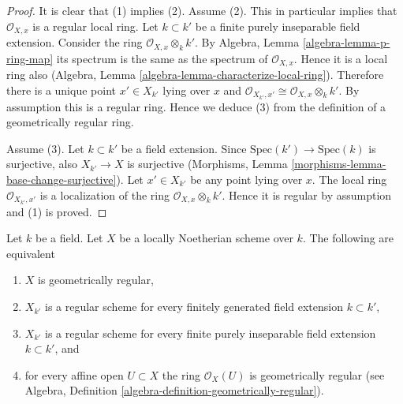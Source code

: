 \begin{proof}
It is clear that (1) implies (2).
Assume (2). This in particular implies that $\mathcal{O}_{X, x}$
is a regular local ring. Let $k \subset k'$ be a finite purely inseparable
field extension. Consider the ring $\mathcal{O}_{X, x} \otimes_k k'$.
By Algebra, Lemma \ref{algebra-lemma-p-ring-map}
its spectrum is the same as the spectrum of $\mathcal{O}_{X, x}$.
Hence it is a local ring also
(Algebra, Lemma \ref{algebra-lemma-characterize-local-ring}).
Therefore there is a unique point $x' \in X_{k'}$ lying over $x$
and $\mathcal{O}_{X_{k'}, x'} \cong \mathcal{O}_{X, x} \otimes_k k'$.
By assumption this is a regular ring. Hence we deduce (3)
from the definition of a geometrically regular ring.

\medskip\noindent
Assume (3). Let $k \subset k'$ be a field extension. Since
$\text{Spec}(k') \to \text{Spec}(k)$ is surjective, also
$X_{k'} \to X$ is surjective
(Morphisms, Lemma \ref{morphisms-lemma-base-change-surjective}).
Let $x' \in X_{k'}$ be any point lying over $x$.
The local ring $\mathcal{O}_{X_{k'}, x'}$
is a localization of the ring $\mathcal{O}_{X, x} \otimes_k k'$.
Hence it is regular by assumption and (1) is proved.
\end{proof}

\begin{lemma}
\label{lemma-geometrically-regular}
Let $k$ be a field.
Let $X$ be a locally Noetherian scheme over $k$.
The following are equivalent
\begin{enumerate}
\item $X$ is geometrically regular,
\item $X_{k'}$ is a regular scheme for every finitely generated field
extension $k \subset k'$,
\item $X_{k'}$ is a regular scheme for every finite purely inseparable
field extension $k \subset k'$, and
\item for every affine open $U \subset X$ the ring $\mathcal{O}_X(U)$
is geometrically regular (see
Algebra, Definition \ref{algebra-definition-geometrically-regular}).
\end{enumerate}
\end{lemma}

